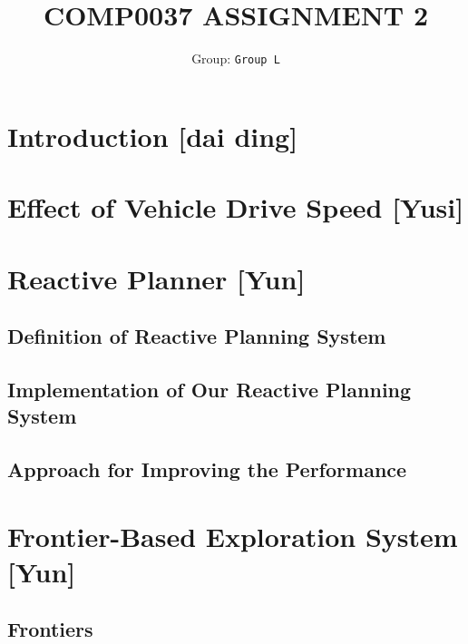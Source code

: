 \documentclass{article}
\title{COMP0037 ASSIGNMENT 2}
\author{
 Group: \texttt{Group L}\\
}
\date{}
\begin{document}
\maketitle



\section{Introduction [dai ding]} 

\section{Effect of Vehicle Drive Speed [Yusi]}

\section{Reactive Planner [Yun]}

\subsection {Definition of Reactive Planning System}

\subsection {Implementation of Our Reactive Planning System}

\subsection {Approach for Improving the Performance}

\section{Frontier-Based Exploration System [Yun]}

\subsection {Frontiers}
\end{document}

